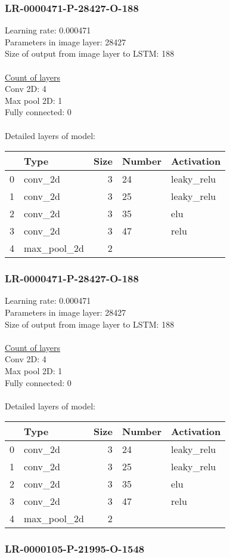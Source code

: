 \subsubsection*{LR-0000471-P-28427-O-188}
Learning rate: 0.000471
\\Parameters in image layer: 28427
\\Size of output from image layer to LSTM: 188
\\\\\underline{Count of layers} 
\\Conv 2D:           4\\Max pool 2D:      1\\Fully connected:  0
\\\\Detailed layers of model: \\\begin{tabular}{rlrll}
\hline
    & Type        &   Size & Number   & Activation   \\
\hline
  0 & conv\_2d     &      3 & 24       & leaky\_relu   \\
  1 & conv\_2d     &      3 & 25       & leaky\_relu   \\
  2 & conv\_2d     &      3 & 35       & elu          \\
  3 & conv\_2d     &      3 & 47       & relu         \\
  4 & max\_pool\_2d &      2 &          &              \\
\hline
\end{tabular}\subsubsection*{LR-0000471-P-28427-O-188}
Learning rate: 0.000471
\\Parameters in image layer: 28427
\\Size of output from image layer to LSTM: 188
\\\\\underline{Count of layers} 
\\Conv 2D:           4\\Max pool 2D:      1\\Fully connected:  0
\\\\Detailed layers of model: \\\begin{tabular}{rlrll}
\hline
    & Type        &   Size & Number   & Activation   \\
\hline
  0 & conv\_2d     &      3 & 24       & leaky\_relu   \\
  1 & conv\_2d     &      3 & 25       & leaky\_relu   \\
  2 & conv\_2d     &      3 & 35       & elu          \\
  3 & conv\_2d     &      3 & 47       & relu         \\
  4 & max\_pool\_2d &      2 &          &              \\
\hline
\end{tabular}\subsubsection*{LR-0000105-P-21995-O-1548}
